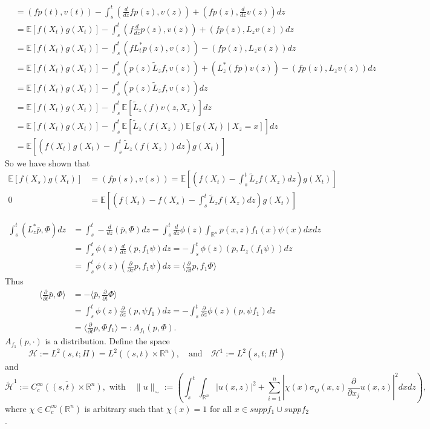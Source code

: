 \documentclass[a4paper,12pt,twoside]{article}
\begin{document}
{\begin{align*}
        &= ( f p(t), v(t)) - \int_s^t  ( \frac{d}{d z} fp (z),v(z) ) + (fp(z), \frac{d}{dz} v(z)) dz \\
        &= \mathbb{E}[ f(X_t) g(X_t)] - \int_s^t (  f\frac{d}{d z}p (z),v(z) ) + (fp(z), L_z v(z)) dz \\
        &= \mathbb{E}[ f(X_t) g(X_t)] - \int_s^t (  f L_t^* p (z),v(z) ) - (fp(z), L_z v(z)) dz \\
        &= \mathbb{E}[ f(X_t) g(X_t)] - \int_s^t (p(z) \tilde{L}_z f, v(z)) + ( L_z^* (fp)v(z)) - (fp(z), L_z v(z)) dz \\
        &= \mathbb{E}[ f(X_t) g(X_t)] - \int_s^t (p(z) \tilde{L}_z f, v(z))  dz \\
         &= \mathbb{E}[ f(X_t) g(X_t)] - \int_s^t \mathbb{E}[ \tilde{L}_z (f) v(z,X_z) ]  dz \\
         &= \mathbb{E}[ f(X_t) g(X_t)] - \int_s^t \mathbb{E}[ \tilde{L}_z (f(X_z)) \mathbb{E}[ g(X_t) \mid X_z =x ] ]  dz \\
         &= \mathbb{E}[ (f(X_t) g(X_t) - \int_s^t \tilde{L}_z (f(X_z))    dz ) g(X_t) ] 
    \end{align*}
    So we have shown that 
    \begin{align*}
        \mathbb{E}[ f(X_s) g(X_t) ] &=  (fp(s),v(s)) = \mathbb{E}[ ( f(X_t)- \int_s^t \tilde{L}_z f(X_z) dz ) g(X_t) ]\\
        0 &= \mathbb{E}[ ( f(X_t) - f(X_s) - \int_s^t \tilde{L}_z f(X_z) dz ) g(X_t) ]
    \end{align*}


\begin{align*}
    \int_s^t (L_z^* \bar{p},\Phi) dz &= \int_s^t - \frac{d}{dz} (\bar{p},\Phi) dz = \int_s^t \frac{d}{dz} \phi (z) \int_{\mathbb{R}^n} p(x,z) f_1 (x) \psi (x) dx dz \\
    &= \int_s^t \phi (z) \frac{d}{dz} (p,f_1 \psi) dz = - \int_s^t \phi (z) (p,L_z(f_1 \psi)) dz \\
    &= \int_s^t \phi (z) ( \frac{\partial}{\partial z} p, f_1 \psi ) dz = \langle \frac{\partial}{\partial t} p, f_1 \Phi \rangle 
 \end{align*}
 Thus 
 \begin{align*}
    \langle \frac{\partial}{\partial t} \bar{p}, \Phi \rangle &= - \langle \bar{p}, \frac{\partial}{\partial t} \Phi \rangle \\
    &= \int_s^t \phi (z) \frac{\partial}{\partial z} (p,\psi f_1) dz = -\int_s^t \frac{\partial}{\partial z} \phi (z) (p, \psi f_1)dz \\
    &= \langle \frac{\partial}{\partial t} p, \Phi f_1 \rangle =: A_{f_1} (p,\Phi).
 \end{align*}
 $A_{f_1} (p,\cdot)$ is a distribution. Define the space 
 \[
 \mathcal{H} := L^2(s,t; H) = L^2 ((s,t) \times \mathbb{R}^n), \quad \text{and} \quad \mathcal{H}^1 := L^2(s,t; H^1)
 \]
 and 
 \[
 \tilde{\mathcal{H}}^1 := \overline{ C_c^\infty((s,t) \times \mathbb{R}^n) }, \text{ with} \quad \| u \|_\sim := \left( \int_s^t \int_{\mathbb{R}^n} |u(x,z)|^2 + \sum_{i=1}^n |\chi (x) \sigma_{ij} (x,z) \frac{\partial}{\partial x_j} u(x,z) |^2 dx dz \right),
 \]
 where $\chi \in C_c^\infty (\mathbb{R}^n)$ is arbitrary such that $\chi (x) =1$ for all $x \in supp f_1 \cup supp f_2$.
 
}
\end{document}
